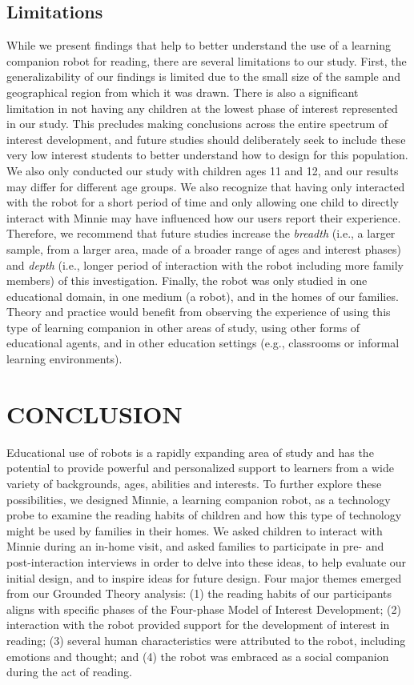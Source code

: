 \documentclass{sigchi}
\begin{document}
\subsection{Limitations}
While we present findings that help to better understand the use of a learning companion robot for reading, there are several limitations to our study. First, the generalizability of our findings is limited due to the small size of the sample and {\color{blue}geographical region from which it was drawn. There is also a significant limitation in not having any children at the lowest phase of interest represented in our study. This precludes making conclusions across the entire spectrum of interest development, and future studies should deliberately seek to include these very low interest students to better understand how to design for this population.}  We also only conducted our study with children ages 11 and 12, and our results may differ for different age groups. We also recognize that having only interacted with the robot for a short period of time and only allowing one child to directly interact with Minnie may have influenced how our users report their experience. Therefore, we recommend that future studies increase the \textit{breadth} (i.e., a larger sample, from a larger area, made of a broader range of ages and interest phases) and \textit{depth} (i.e., longer period of interaction with the robot including more family members) of this investigation. Finally, the robot was only studied in one educational domain, in one medium (a robot), and in the homes of our families. Theory and practice would benefit from observing the experience of using this type of learning companion in other areas of study, using other forms of educational agents, and in other education settings (e.g., classrooms or informal learning environments).

\section{CONCLUSION}
Educational use of robots is a rapidly expanding area of study and has the potential to provide powerful and personalized support to learners from a wide variety of backgrounds, ages, abilities and interests. To further explore these possibilities, we designed Minnie, a learning companion robot, as a technology probe to examine the reading habits of children and how this type of technology might be used by families in their homes. We asked children to interact with Minnie during an in-home visit, and asked families to participate in pre- and post-interaction interviews in order to delve into these ideas, to help evaluate our initial design, and to inspire ideas for future design. Four major themes emerged from our Grounded Theory analysis: (1) the reading habits of our participants aligns with specific phases of the Four-phase Model of Interest Development; (2) interaction with the robot provided support for the development of interest in reading; (3) several human characteristics were attributed to the robot, including emotions and thought; and (4) the robot was embraced as a social companion during the act of reading.
\end{document}
